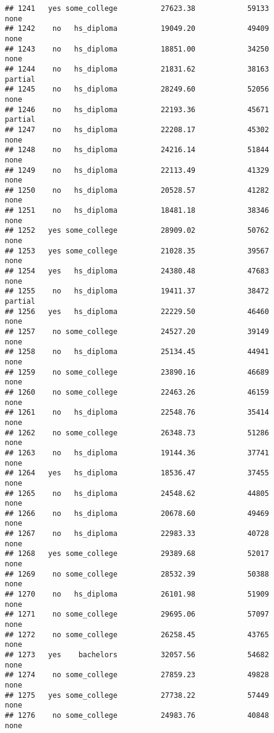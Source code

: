 \documentclass[
]{article}
\begin{document}
\begin{verbatim}
## 1241   yes some_college          27623.38            59133        none
## 1242    no   hs_diploma          19049.20            49409        none
## 1243    no   hs_diploma          18851.00            34250        none
## 1244    no   hs_diploma          21831.62            38163     partial
## 1245    no   hs_diploma          28249.60            52056        none
## 1246    no   hs_diploma          22193.36            45671     partial
## 1247    no   hs_diploma          22208.17            45302        none
## 1248    no   hs_diploma          24216.14            51844        none
## 1249    no   hs_diploma          22113.49            41329        none
## 1250    no   hs_diploma          20528.57            41282        none
## 1251    no   hs_diploma          18481.18            38346        none
## 1252   yes some_college          28909.02            50762        none
## 1253   yes some_college          21028.35            39567        none
## 1254   yes   hs_diploma          24380.48            47683        none
## 1255    no   hs_diploma          19411.37            38472     partial
## 1256   yes   hs_diploma          22229.50            46460        none
## 1257    no some_college          24527.20            39149        none
## 1258    no   hs_diploma          25134.45            44941        none
## 1259    no some_college          23890.16            46689        none
## 1260    no some_college          22463.26            46159        none
## 1261    no   hs_diploma          22548.76            35414        none
## 1262    no some_college          26348.73            51286        none
## 1263    no   hs_diploma          19144.36            37741        none
## 1264   yes   hs_diploma          18536.47            37455        none
## 1265    no   hs_diploma          24548.62            44805        none
## 1266    no   hs_diploma          20678.60            49469        none
## 1267    no   hs_diploma          22983.33            40728        none
## 1268   yes some_college          29389.68            52017        none
## 1269    no some_college          28532.39            50388        none
## 1270    no   hs_diploma          26101.98            51909        none
## 1271    no some_college          29695.06            57097        none
## 1272    no some_college          26258.45            43765        none
## 1273   yes    bachelors          32057.56            54682        none
## 1274    no some_college          27859.23            49828        none
## 1275   yes some_college          27738.22            57449        none
## 1276    no some_college          24983.76            40848        none

\end{verbatim}
\end{document}
